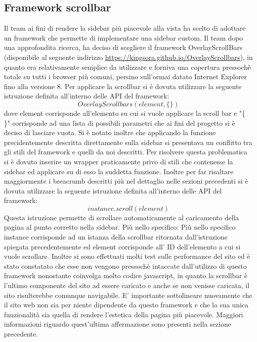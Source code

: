 \documentclass[12pt]{article}
\begin{document}
	\subsection{Framework scrollbar}
	Il team ai fini di rendere la sidebar più piacevole alla vista ha scelto di adottare un framework che permette di implementare una sidebar custom. Il team dopo una approfondita ricerca, ha deciso di scegliere il framework OverlayScrollBars (disponibile al seguente indirizzo \url{https://kingsora.github.io/OverlayScrollbars}), in quanto era relativamente semplice da utilizzare e forniva una copertura pressochè totale su tutti i browser più comuni, persino sull'ormai datato Internet Explorer fino alla versione 8.
	Per applicare la scrollbar si è dovuta utilizzare la seguente istruzione definita all'interno delle API del framework:
	\[ OverlayScrollbars(element, \{ \}) \]
	dove element corrisponde all'elemento su cui si vuole applicare la scroll bar e "\{ \}" corrisponde ad una lista di possibili parametri che ai fini del progetto si è deciso di lasciare vuota.
	Si è notato inoltre che applicando la funzione precidentemente descritta direttamente sulla sidebar si presentava un conflitto tra gli stili del framework e quelli da noi descritti. Per risolvere questa problematica si è dovuto inserire un wrapper praticamente privo di stili che contenesse la sidebar ed applicare su di esso la suddetta funzione.
	Inoltre per far risaltare maggiormente i breacrumb descritti più nel dettaglio nelle sezioni precedenti si è dovuta utilizzare la seguente istruzione definita all'interno delle API del framework:
	\[ instance.scroll(element) \]
	Questa istruzione permette di scrollare automaticamente al caricamento della pagina al punto corretto nella sidebar. Più nello specifico:
	Più nello specifico instance corrisponde ad un istanza della scrollbar ritornata dall'istruzione spiegata precedentemente ed element corrisponde all' ID dell'elemento a cui si vuole scrollare.
	Inoltre si sono effettuati molti test sulle performance del sito ed è stato constatato che esse non vengono pressochè intaccate dall'utilizzo di questo framework nonostante coinvolga molto codice javascript, in quanto la scrollbar è l'ultimo componente del sito ad essere caricato e anche se non venisse caricata, il sito risulterebbe comunque navigabile.
	E' importante sottolineare nuovamente che il sito web non sia per niente dipendente da questo framework e che la sua unica funzionalità sia quella di rendere l'estetica della pagina più piacevole. Maggiori informazioni riguardo quest'ultima affermazione sono presenti nella sezione precedente.
\end{document}
